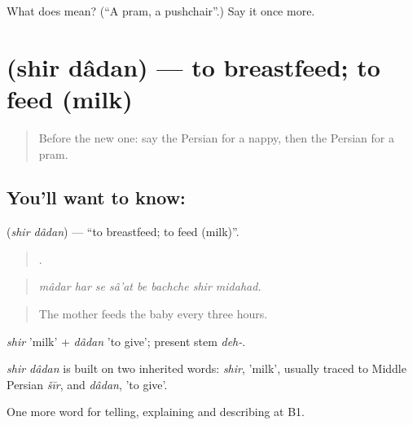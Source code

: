 \begin{tcolorbox}[breakable,colback=teal!4,colframe=teal!35!black,title={Before you move on}]
What does  mean? (\textquotedblleft{}A pram, a pushchair\textquotedblright{}.) Say it once more.
\end{tcolorbox}
\section[\texorpdfstring{\fa{شیر} \fa{دادن} (shir dâdan)}{شیر دادن (shir dâdan)}]{  (shir dâdan) — to breastfeed; to feed (milk)}

\label{lesson:FA-C502-shir-dadan}



\begin{quote}
Before the new one: say the Persian for a nappy, then the Persian for a pram.
\end{quote}

\subsection*{You'll want to know:  }
\textbf{ } (\emph{shir dâdan}) — \textquotedblleft{}to breastfeed; to feed (milk)\textquotedblright{}.

\begin{quote}
       .
\end{quote}

\begin{quote}
\emph{mâdar har se sâ'at be bachche shir midahad.}
\end{quote}

\begin{quote}
The mother feeds the baby every three hours.
\end{quote}

\emph{shir} 'milk' + \emph{dâdan} 'to give'; present stem \emph{deh-}.

\begin{cousinweb}
\emph{shir dâdan} is built on two inherited words: \emph{shir}, 'milk', usually traced to Middle Persian \emph{šīr}, and \emph{dâdan}, 'to give'.
\end{cousinweb}

\begin{grammarlens}[title={What you've built}]
One more word for telling, explaining and describing at B1.
\end{grammarlens}

